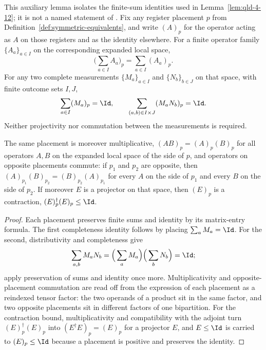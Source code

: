 \begin{lemma}
	\label{lem:qld-placement-completeness}
	\leanok
	This auxiliary lemma isolates the finite-sum identities used in
	Lemma~\ref{lem:qld-4-12}; it is not a named statement of
	\cite{Ji2020MIPStar}. Fix any register placement $p$ from
	Definition~\ref{def:symmetric-equivalents}, and write $(A)_p$ for the
	operator acting as $A$ on those registers and as the identity elsewhere.
	For a finite operator family $\{A_a\}_{a\in I}$ on the corresponding
	expanded local space,
	\[
		\Big(\sum_{a\in I}A_a\Big)_p=\sum_{a\in I}(A_a)_p.
	\]
	For any two complete measurements $\{M_a\}_{a\in I}$ and
	$\{N_b\}_{b\in J}$ on that space, with finite outcome sets $I,J$,
	\[
		\sum_{a\in I}(M_a)_p=\Id,
		\qquad
		\sum_{(a,b)\in I\times J}(M_aN_b)_p=\Id.
	\]
	Neither projectivity nor commutation between the measurements is required.

	The same placement is moreover multiplicative,
	$(AB)_p = (A)_p (B)_p$ for all operators $A, B$ on the expanded local
	space of the side of $p$, and operators on opposite placements commute:
	if $p_1$ and $p_2$ are opposite, then
	$(A)_{p_1} (B)_{p_2} = (B)_{p_2} (A)_{p_1}$ for every $A$ on the side of
	$p_1$ and every $B$ on the side of $p_2$. If moreover $E$ is a projector
	on that space, then $(E)_p$ is a contraction,
	$(E)_p^\dagger (E)_p \le \Id$.
\end{lemma}
\begin{proof}
	\leanok
	Each placement preserves finite sums and identity by its matrix-entry
	formula. The first completeness identity follows by placing
	$\sum_a M_a=\Id$. For the second, distributivity and completeness give
	\[
		\sum_{a,b}M_aN_b
		=\Big(\sum_a M_a\Big)\Big(\sum_b N_b\Big)=\Id;
	\]
	apply preservation of sums and identity once more.
	Multiplicativity and opposite-placement commutation are read off from the
	expression of each placement as a reindexed tensor factor: the two
	operands of a product sit in the same factor, and two opposite placements
	sit in different factors of one bipartition. For the contraction bound,
	multiplicativity and compatibility with the adjoint turn
	$(E)_p^\dagger (E)_p$ into $(E^\dagger E)_p = (E)_p$ for a projector
	$E$, and $E \le \Id$ is carried to $(E)_p \le \Id$ because a placement
	is positive and preserves the identity.
\end{proof}

